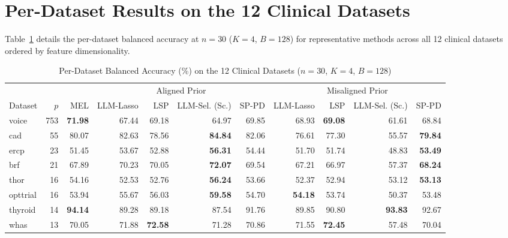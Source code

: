 \clearpage
\section{Per-Dataset Results on the 12 Clinical Datasets}
\label{app:clinical_detail}

Table~\ref{tab:app_clinical_detail} details the per-dataset balanced accuracy at $n = 30$ ($K = 4$, $B = 128$) for representative methods across all 12 clinical datasets ordered by feature dimensionality.

\begin{table}[!htbp]
\centering
\begin{threeparttable}
\caption{Per-Dataset Balanced Accuracy (\%) on the 12 Clinical Datasets ($n = 30$, $K = 4$, $B = 128$)}
\label{tab:app_clinical_detail}
\scriptsize
\setlength{\tabcolsep}{6.0pt}
\renewcommand{\arraystretch}{1.06}
\begin{tabular}{@{}lr@{\hspace{12pt}}rrrrr@{\hspace{14pt}}rrrr@{}}
\toprule
 & & & \multicolumn{4}{c}{Aligned Prior} & \multicolumn{4}{c}{Misaligned Prior} \\
\cmidrule(lr{14pt}){4-7} \cmidrule(l){8-11}
Dataset & $p$ & MEL & LLM-Lasso & LSP & LLM-Sel. (Sc.) & SP-PD & LLM-Lasso & LSP & LLM-Sel. (Sc.) & SP-PD \\
\midrule
voice      & 753 & \textbf{71.98} & 67.44 & 69.18 & 64.97 & 69.85 & 68.93 & \textbf{69.08} & 61.61 & 68.84 \\
cad        &  55 & 80.07 & 82.63 & 78.56 & \textbf{84.84} & 82.06 & 76.61 & 77.30 & 55.57 & \textbf{79.84} \\
ercp       &  23 & 51.45 & 53.67 & 52.88 & \textbf{56.31} & 54.44 & 51.70 & 51.74 & 48.83 & \textbf{53.49} \\
brf        &  21 & 67.89 & 70.23 & 70.05 & \textbf{72.07} & 69.54 & 67.21 & 66.97 & 57.37 & \textbf{68.24} \\
thor       &  16 & 54.16 & 52.53 & 52.76 & \textbf{56.24} & 53.66 & 52.37 & 52.94 & 53.12 & \textbf{53.13} \\
opttrial   &  16 & 53.94 & 55.67 & 56.03 & \textbf{59.58} & 54.70 & \textbf{54.18} & 53.74 & 50.37 & 53.48 \\
thyroid    &  14 & \textbf{94.14} & 89.28 & 89.18 & 87.54 & 91.76 & 89.85 & 90.80 & \textbf{93.83} & 92.67 \\
whas       &  13 & 70.05 & 71.88 & \textbf{72.58} & 71.28 & 70.86 & 71.55 & \textbf{72.45} & 57.48 & 70.04 \\

\end{tabular}
\end{threeparttable}
\end{table}

